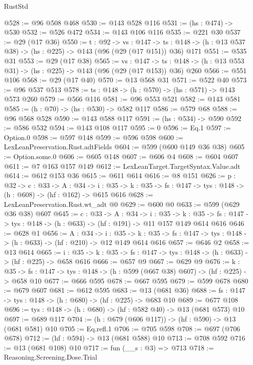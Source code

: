 \begin{lexlean}{RustStd}
\begin{coremodule}
{\begin{coremodule}
{{@528 := @96 @508 @468
@530 := @143 @528 @116
@531 := (hs : @474) -> @530
@532 := @526 @472
@534 := @143 @106 @116
@535 := @221 @30
@537 := @29 (@17 @36)
@550 := {t : @92} ->
  {vs : @147} ->
  {ts : @148} -> (h : @13 @537 @38) -> (hs : @225) -> @143 (@96 (@29 (@17 @151)) @36) @171
@551 := @535 @31
@553 := @29 (@17 @38)
@565 := {vs : @147} ->
  {ts : @148} -> (h : @13 @553 @31) -> (hs : @225) -> @143 (@96 (@29 (@17 @153)) @36) @260
@566 := @551 @106
@568 := @29 (@17 @40)
@570 := @13 @568 @31
@571 := @522 @40
@573 := @96 @537 @513
@578 := {ts : @148} -> (h : @570) -> (hs : @571) -> @143 @573 @260
@579 := @566 @116
@581 := @96 @553 @521
@582 := @143 @581
@585 := (h : @70) -> (hs : @530) -> @582 @117
@586 := @579 @68
@588 := @96 @568 @528
@590 := @143 @588 @117
@591 := (hs : @534) -> @590
@592 := @586 @532
@594 := @143 @108 @117
@595 := 0
@596 := Eq.{1}
@597 := Option.{0}
@598 := @597 @148
@599 := @596 @598
@600 := LexLeanPreservation.Rust.adtFields
@604 := @599 (@600 @149 @36 @38)
@605 := Option.some.{0}
@606 := @605 @148
@607 := @606 @4
@608 := @604 @607
@611 := @7 @163 @157 @149
@612 := LexLeanTarget.TargetSyntax.Value.adt
@614 := @612 @153 @36
@615 := @611 @614
@616 := @8 @151
@626 := {p : @32} ->
  {c : @33} ->
  {A : @34} ->
  {i : @35} -> {k : @35} -> {fs : @147} -> {tys : @148} -> (h : @608) -> (hf : @162) -> @615 @616
@628 := LexLeanPreservation.Rust.wt_adt @0
@629 := @600 @0
@633 := @599 (@629 @36 @38) @607
@645 := {c : @33} ->
  {A : @34} ->
  {i : @35} ->
  {k : @35} -> {fs : @147} -> {tys : @148} -> (h : @633) -> (hf : @191) -> @11 @157 @149 @614 @616
@646 := @628 @1
@656 := {A : @34} ->
  {i : @35} ->
  {k : @35} -> {fs : @147} -> {tys : @148} -> (h : @633) -> (hf : @210) -> @12 @149 @614 @616
@657 := @646 @2
@658 := @13 @614
@665 := {i : @35} ->
  {k : @35} -> {fs : @147} -> {tys : @148} -> (h : @633) -> (hf : @225) -> @658 @616
@666 := @657 @9
@667 := @629 @9
@676 := {k : @35} ->
  {fs : @147} -> {tys : @148} -> (h : @599 (@667 @38) @607) -> (hf : @225) -> @658 @10
@677 := @666 @595
@678 := @667 @595
@679 := @599 @678
@680 := @679 @607
@681 := @612 @595
@683 := @13 (@681 @36)
@688 := {fs : @147} -> {tys : @148} -> (h : @680) -> (hf : @225) -> @683 @10
@689 := @677 @108
@696 := {tys : @148} -> (h : @680) -> (hf : @582 @40) -> @13 (@681 @573) @10
@697 := @689 @117
@704 := (h : @679 (@606 @117)) -> (hf : @590) -> @13 (@681 @581) @10
@705 := Eq.refl.{1}
@706 := @705 @598
@708 := @697 (@706 @678)
@712 := (hf : @594) -> @13 (@681 @588) @10
@713 := @708 @592
@716 := @13 (@681 @108) @10
@717 := fun (__s : @3) => @713
@718 := Reasoning.Screening.Dose.Trial
}}
\end{coremodule}}
\end{coremodule}
\end{lexlean}
